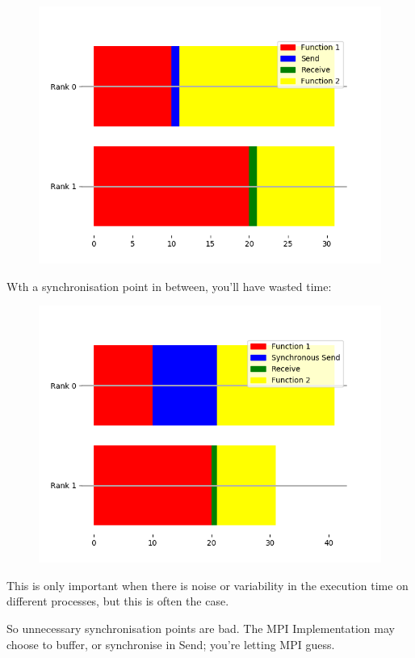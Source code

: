 \begin{figure}[htbp]
\centering
\includegraphics{06MPI/figures/efficient.png}
\end{figure}

Wth a synchronisation point in between, you'll have wasted time:

\begin{figure}[htbp]
\centering
\includegraphics{06MPI/figures/inefficient.png}
\end{figure}

This is only important when there is noise or variability in the
execution time on different processes, but this is often the case.

So unnecessary synchronisation points are bad. The MPI Implementation
may choose to buffer, or synchronise in Send; you're letting MPI guess.

